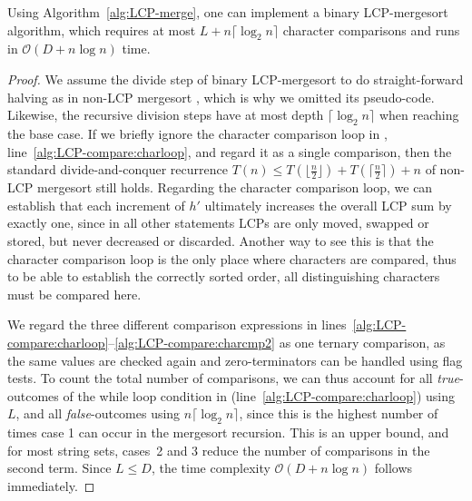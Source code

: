 \documentclass[a4paper]{myjournal}
\newcommand{\Oh}[1]{\mathcal{O}\!\left( #1\right)}
\def\Oh#1{\mathcal{O}(#1)}
\begin{document}
\begin{theorem}\label{thm:LCP-mergesort}
  Using Algorithm~\ref{alg:LCP-merge}, one can implement a binary LCP-mergesort
  algorithm, which requires at most $L + n \lceil \log_2 n \rceil$ character
  comparisons and runs in $\Oh{D + n \log n}$ time.
\end{theorem}
\begin{proof}
  We assume the divide step of binary LCP-mergesort to do straight-forward
  halving as in non-LCP mergesort \cite{knuth1998sorting}, which is why we
  omitted its pseudo-code. Likewise, the recursive division steps have at most
  depth $\lceil \log_2 n \rceil$ when reaching the base case. If we briefly
  ignore the character comparison loop in \LCPCompare,
  line~\ref{alg:LCP-compare:charloop}, and regard it as a single comparison,
  then the standard divide-and-conquer recurrence $T(n) \leq T(\lfloor
  \frac{n}{2} \rfloor) + T(\lceil \frac{n}{2} \rceil) + n$ of non-LCP mergesort
  still holds. Regarding the character comparison loop, we can establish that
  each increment of $h'$ ultimately increases the overall LCP sum by exactly
  one, since in all other statements LCPs are only moved, swapped or stored, but
  never decreased or discarded.  Another way to see this is that the character
  comparison loop is the only place where characters are compared, thus to be
  able to establish the correctly sorted order, all distinguishing characters
  must be compared here.

  We regard the three different comparison expressions in
  lines~\ref{alg:LCP-compare:charloop}--\ref{alg:LCP-compare:charcmp2} as one
  ternary comparison, as the same values are checked again and zero-terminators
  can be handled using flag tests.  To count the total number of comparisons, we
  can thus account for all \textsl{true}-outcomes of the while loop condition in
  \LCPCompare (line~\ref{alg:LCP-compare:charloop}) using $L$, and all
  \textsl{false}-outcomes using $n \lceil \log_2 n \rceil$, since this is the
  highest number of times case 1 can occur in the mergesort recursion. This is
  an upper bound, and for most string sets, cases~2 and 3 reduce the number of
  comparisons in the second term.  Since $L \leq D$, the time complexity $\Oh{D
    + n \log n}$ follows immediately.
\end{proof}
\end{document}
